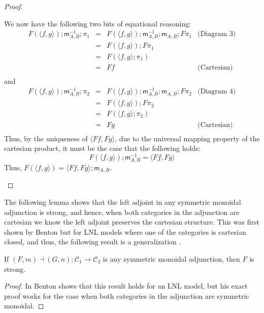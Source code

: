 \documentclass{article}
\let\mto\to
\let\to\rightarrow
\newcommand{\cat}[1]{\mathcal{#1}}
\newcommand{\m}[1]{\mathsf{m}_{#1}}
\begin{document}
\begin{proof}
\begin{itemize}
    We now have the following two bits of equational reasoning:
    \[
    \begin{array}{lllll}
      F(\langle f,g \rangle);\m{A,B}^{-1};\pi_1
      & = & F(\langle f,g \rangle);\m{A,B}^{-1};\m{A,B};F\pi_1 & \text{(Diagram 3)}\\
      & = & F(\langle f,g \rangle);F\pi_1 & \text{}\\
      & = & F(\langle f,g \rangle;\pi_1) & \text{}\\
      & = & Ff & \text{(Cartesian)}\\
    \end{array}      
    \]
    and
    \[
    \begin{array}{lllll}
      F(\langle f,g \rangle);\m{A,B}^{-1};\pi_2
      & = & F(\langle f,g \rangle);\m{A,B}^{-1};\m{A,B};F\pi_2 & \text{(Diagram 4)}\\
      & = & F(\langle f,g \rangle);F\pi_2 & \text{}\\
      & = & F(\langle f,g \rangle;\pi_2) & \text{}\\
      & = & Fg & \text{(Cartesian)}\\
    \end{array}      
    \]
    Thus, by the uniqueness of $\langle Ff,Fg \rangle$, due to the
    universal mapping property of the cartesian product, it must be
    the case that the following holds:
    \[
    F(\langle f,g \rangle);\m{A,B}^{-1} = \langle Ff,Fg \rangle
    \]
    Thus, $F(\langle f,g \rangle) = \langle Ff,Fg \rangle;\m{A,B}$.
  \end{itemize}  
\end{proof}
\fi

The following lemma shows that the left adjoint in any symmetric
monoidal adjunction is strong, and hence, when both categories in the
adjunction are cartesian we know the left adjoint preserves the
cartesian structure.  This was first shown by Benton but for LNL
models where one of the categories is cartesian closed, and thus, the
following result is a generalization \cite{benton1995}.

\begin{lemma}
  \label{lemma:product_functors_strong}
  If $(F,m) \dashv (G,n) : \cat{C}_1 \mto \cat{C}_2$ is any symmetric
  monoidal adjunction, then $F$ is strong.
\end{lemma}
\begin{proof}
  In \cite{benton1995} Benton shows that this result holds for an LNL
  model, but his exact proof works for the case when both categories
  in the adjunction are symmetric monoidal.  
\end{proof}
\end{document}
